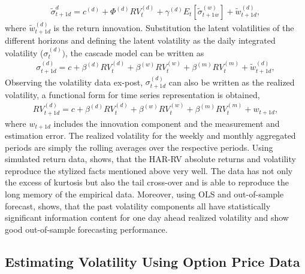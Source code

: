 \begin{align*}
\tilde{\sigma}_{t+1d}^{d} = c^{(d)} + \Phi^{(d)} RV_{t}^{(d)} + \gamma^{(d)} E_{t}[\tilde{\sigma}_{t+1w}^{(w)}] + \tilde{w}_{t+1d}^{(d)},
\end{align*}
where $\tilde{w}_{t+1d}^{(d)}$ is the return innovation. Substitution the latent volatilities of the different horizons and defining the latent volatility as the daily integrated volatility ($\sigma_{t}^{(d)})$, the cascade model can be written as
\begin{align}\label{eq:cascade-model}
\sigma_{t+1d}^{(d)} = c + \beta^{(d)} RV_{t}^{(d)} + \beta^{(w)} RV_{t}^{(w)} + \beta^{(m)} RV_{t}^{(m)} + \tilde{w}_{t+1d}^{(d)},
\end{align}
Observing the volatility data ex-post, $\sigma_{t+1d}^{(d)}$ can also be written as the realized volatility, a functional form for time series representation is obtained,
\begin{align}\label{eq:time-series-model}
RV_{t+1d}^{(d)} = c + \beta^{(d)} RV_{t}^{(d)} + \beta^{(w)} RV_{t}^{(w)} + \beta^{(m)} RV_{t}^{(m)} + w_{t+1d} ,
\end{align}
where $w_{t+1d}$ includes the innovation component and the measurement and estimation error. The realized volatility for the weekly and monthly aggregated periods are simply the rolling averages over the respective periods.
Using simulated return data, \textcite{corsi2009} shows, that the HAR-RV absolute returns and volatility reproduce the stylized facts mentioned above very well. The data has not only the excess of kurtosis but also the tail cross-over and is able to reproduce the long memory of the empirical data. Moreover, using OLS and out-of-sample forecast, \textcite{corsi2009} shows, that the past volatility components all have statistically significant information content for one day ahead realized volatility and show good out-of-sample forecasting performance.

\subsection{Estimating Volatility Using Option Price Data}
